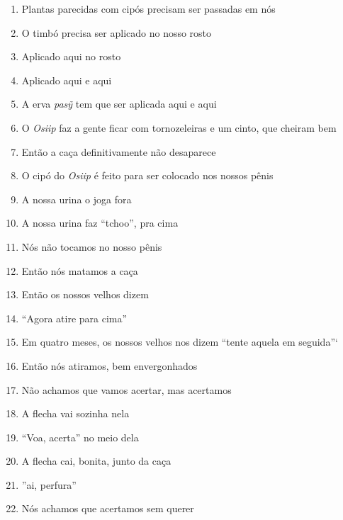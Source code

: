 \begin{enumerate}
 \begin{center}\end{center}
 
 \item Plantas parecidas com cipós precisam ser passadas em nós
 \item O timbó precisa ser aplicado no nosso rosto
 \item Aplicado aqui no rosto
 \item Aplicado aqui e aqui
 \item A erva \textit{pasỹ} tem que ser aplicada aqui e aqui
 
 \begin{center}\end{center}
 
 \item O \textit{Osiip} faz a gente ficar com tornozeleiras e um cinto, que
 cheiram bem
 \item Então a caça definitivamente não desaparece
 \item O cipó do \textit{Osiip} é feito para ser colocado nos nossos pênis
 \item A nossa urina o joga fora
 \item A nossa urina faz ``tchoo'', pra cima
 \item Nós não tocamos no nosso pênis
 \item Então nós matamos a caça
 
 \begin{center}\end{center}
 
 \item Então os nossos velhos dizem
 \item ``Agora atire para cima''
 \item Em quatro meses, os nossos velhos nos dizem ``tente aquela em
 seguida''`
 \item Então nós atiramos, bem envergonhados
 \item Não achamos que vamos acertar, mas acertamos
 
 \begin{center}\end{center}
 
 \item A flecha vai sozinha nela
 \item ``Voa, acerta'' no meio dela
 \item A flecha cai, bonita, junto da caça
 \item ''ai, perfura''
 \item Nós achamos que acertamos sem querer
 

\end{enumerate}
